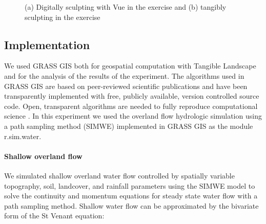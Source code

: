 \documentclass{isprs}
\begin{document}
\begin{figure}
\begin{center}
\hspace{1em}%
\caption{(a) Digitally sculpting with Vue in the  exercise and (b) tangibly sculpting in the  exercise}
\label{fig:exercises}
\end{center}
\end{figure}

\subsection{Implementation}
We used GRASS GIS both
for geospatial computation with Tangible Landscape
and for the analysis of the results of the experiment.
The algorithms used in GRASS GIS are 
based on peer-reviewed scientific publications 
and have been 
transparently implemented 
with free, publicly available, version controlled source code. 
Open, transparent algorithms are needed to fully reproduce computational science \cite{Rocchini2012}. 
In this experiment we used
the overland flow hydrologic simulation using a path sampling method (SIMWE) 
implemented in GRASS GIS as the module r.sim.water.

\paragraph{Shallow overland flow}
We simulated shallow overland water flow controlled by spatially variable topography, soil, landcover, and rainfall parameters using the SIMWE model to solve the continuity and momentum equations for steady state water flow with a path sampling method. 
%
Shallow water flow can be approximated by
the bivariate form of the St Venant equation:
\end{document}
